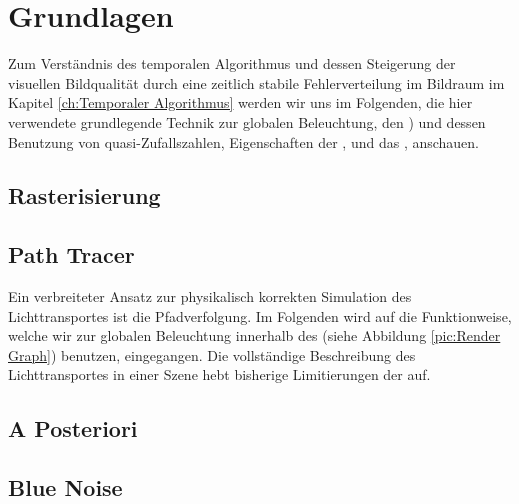 \vfill
\chapter{Grundlagen}
\label{ch:Grundlagen}
Zum Verständnis des temporalen Algorithmus und dessen Steigerung der visuellen Bildqualität durch eine zeitlich stabile  Fehlerverteilung
im Bildraum im Kapitel \ref{ch:Temporaler Algorithmus} werden wir uns im Folgenden, die hier verwendete grundlegende Technik zur globalen
Beleuchtung, den ) und dessen Benutzung von quasi-Zufallszahlen, Eigenschaften der , 
und das , anschauen.

\section{Rasterisierung}
\label{ch:Content1:sec:Rasterisierung}


\newpage
\section{Path Tracer}
\label{ch:Content1:sec:Path Tracer}
Ein verbreiteter Ansatz zur physikalisch korrekten Simulation des Lichttransportes ist die Pfadverfolgung. Im Folgenden wird auf die Funktionweise, welche wir 
zur globalen Beleuchtung innerhalb des (siehe Abbildung \ref{pic:Render Graph}) benutzen, eingegangen. Die vollständige 
Beschreibung des Lichttransportes in einer Szene hebt bisherige Limitierungen der  auf. 
\par


\newpage
\section{A Posteriori}
\label{ch:Content2:sec:a Posteriori}


\newpage
\section{Blue Noise}
\label{ch:Content1:sec:blue noise}



